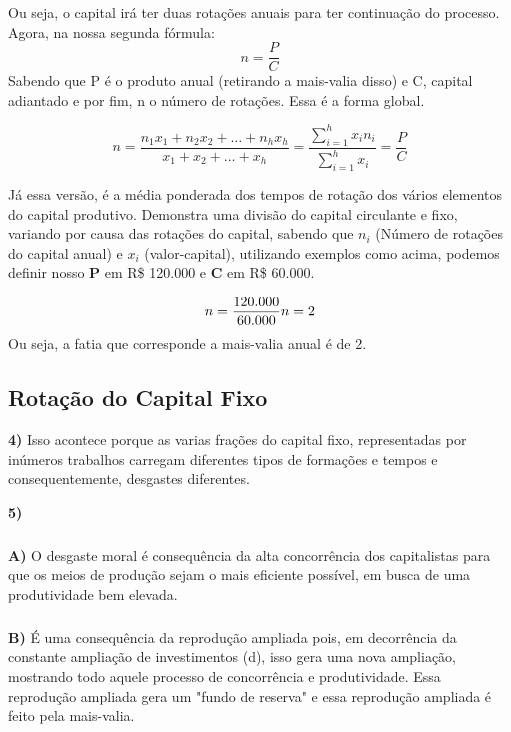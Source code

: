 \documentclass[a4paper, 12pt]{article} %
\begin{document}
Ou seja, o capital irá ter duas rotações anuais para ter continuação do processo.
\\
Agora, na nossa segunda fórmula: 
\begin{equation}
n = \dfrac{P}{C}
\end{equation}
Sabendo que P é o produto anual (retirando a mais-valia disso) e C, capital adiantado e por fim, n o número de rotações. Essa é a forma global.


\begin{equation}
n=\frac{n_{1} x_{1}+n_{2} x_{2}+\ldots+n_{h} x_{h}}{x_{1}+x_{2}+\ldots+x_{h}}=\frac{\sum_{i=1}^{h} x_{i} n_{i}}{\sum_{i=1}^{h} x_{i}}=\frac{P}{C}
\end{equation}

Já essa versão, é a média ponderada dos tempos de rotação dos vários elementos do capital produtivo. Demonstra uma divisão do capital circulante e fixo, variando por causa das rotações do capital, sabendo que \textbf{$n_{i}$} (Número de rotações do capital anual) e \textbf{$x_{i}$} (valor-capital), utilizando exemplos como acima, podemos definir nosso \textbf{P} em R\$ 120.000 e \textbf{C} em R\$ 60.000.

\begin{equation}
n = \dfrac{120.000}{60.000}
$$\\$$
n = 2
\end{equation}
Ou seja, a fatia que corresponde a mais-valia anual é de 2.

\begin{center}
\section{Rotação do Capital Fixo}
\end{center}

\par \textbf{4)} Isso acontece porque as varias frações do capital fixo, representadas por inúmeros trabalhos carregam diferentes tipos de formações e tempos e consequentemente, desgastes diferentes.

\vspace{0.5cm}

\par \textbf{5)} 

\subparagraph{} \textbf{A)} O desgaste moral é consequência da alta concorrência dos capitalistas para que os meios de produção sejam o mais eficiente possível, em busca de uma produtividade bem elevada.

\subparagraph{} \textbf{B)} É uma consequência da reprodução ampliada pois, em decorrência da constante ampliação de investimentos (d), isso gera uma nova ampliação, mostrando todo aquele processo de concorrência e produtividade. Essa reprodução ampliada gera um "fundo de reserva" e essa reprodução ampliada é feito pela mais-valia.
\end{document}
